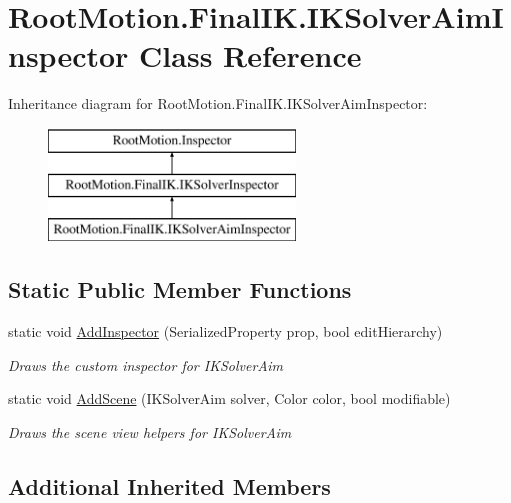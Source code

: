 \hypertarget{class_root_motion_1_1_final_i_k_1_1_i_k_solver_aim_inspector}{}\section{Root\+Motion.\+Final\+I\+K.\+I\+K\+Solver\+Aim\+Inspector Class Reference}
\label{class_root_motion_1_1_final_i_k_1_1_i_k_solver_aim_inspector}
Inheritance diagram for Root\+Motion.\+Final\+I\+K.\+I\+K\+Solver\+Aim\+Inspector\+:\begin{figure}[H]
\begin{center}
\leavevmode
\includegraphics[height=3.000000cm]{class_root_motion_1_1_final_i_k_1_1_i_k_solver_aim_inspector}
\end{center}
\end{figure}
\subsection*{Static Public Member Functions}
\begin{DoxyCompactItemize}
\item 
static void \mbox{\hyperlink{class_root_motion_1_1_final_i_k_1_1_i_k_solver_aim_inspector_a5a322f21eb50fcbab596c6d6909ec87b}{Add\+Inspector}} (Serialized\+Property prop, bool edit\+Hierarchy)
\begin{DoxyCompactList}\small\item\em Draws the custom inspector for I\+K\+Solver\+Aim \end{DoxyCompactList}\item 
static void \mbox{\hyperlink{class_root_motion_1_1_final_i_k_1_1_i_k_solver_aim_inspector_a4ea3824553e843bbd1b07669fe5b309b}{Add\+Scene}} (I\+K\+Solver\+Aim solver, Color color, bool modifiable)
\begin{DoxyCompactList}\small\item\em Draws the scene view helpers for I\+K\+Solver\+Aim \end{DoxyCompactList}\end{DoxyCompactItemize}
\subsection*{Additional Inherited Members}


